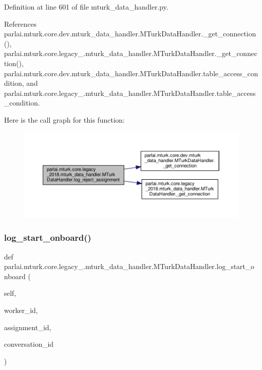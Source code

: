 Definition at line 601 of file mturk\+\_\+data\+\_\+handler.\+py.



References parlai.\+mturk.\+core.\+dev.\+mturk\+\_\+data\+\_\+handler.\+M\+Turk\+Data\+Handler.\+\_\+get\+\_\+connection(), parlai.\+mturk.\+core.\+legacy\+\_.\+mturk\+\_\+data\+\_\+handler.\+M\+Turk\+Data\+Handler.\+\_\+get\+\_\+connection(), parlai.\+mturk.\+core.\+dev.\+mturk\+\_\+data\+\_\+handler.\+M\+Turk\+Data\+Handler.\+table\+\_\+access\+\_\+condition, and parlai.\+mturk.\+core.\+legacy\+\_.\+mturk\+\_\+data\+\_\+handler.\+M\+Turk\+Data\+Handler.\+table\+\_\+access\+\_\+condition.

Here is the call graph for this function\+:
\nopagebreak
\begin{figure}[H]
\begin{center}
\leavevmode
\includegraphics[width=350pt]{classparlai_1_1mturk_1_1core_1_1legacy__2018_1_1mturk__data__handler_1_1MTurkDataHandler_ac2e8b6d462a8ce16509ac25fff7f8c24_cgraph}
\end{center}
\end{figure}
\mbox{\label{classparlai_1_1mturk_1_1core_1_1legacy__2018_1_1mturk__data__handler_1_1MTurkDataHandler_a203c9543a46716e6e51d4d1e795385f5}} 
\subsubsection{\texorpdfstring{log\+\_\+start\+\_\+onboard()}{log\_start\_onboard()}}
{\footnotesize\ttfamily def parlai.\+mturk.\+core.\+legacy\+\_.\+mturk\+\_\+data\+\_\+handler.\+M\+Turk\+Data\+Handler.\+log\+\_\+start\+\_\+onboard (\begin{DoxyParamCaption}\item[{}]{self,  }\item[{}]{worker\+\_\+id,  }\item[{}]{assignment\+\_\+id,  }\item[{}]{conversation\+\_\+id }\end{DoxyParamCaption})}


